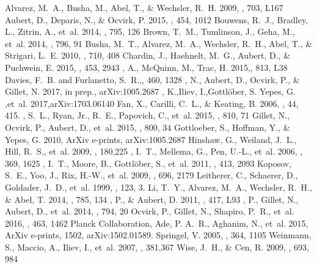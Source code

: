 \documentclass[twocolumn]{aastex61}
\begin{document}
\begin{thebibliography}{}

 Alvarez, M.~A., Busha, M., Abel, T., \& Wechsler, R.~H. 2009, \apjl,
  703, L167
 Aubert, D., Deparis, N., \& Ocvirk, P. 2015, \mnras, 454, 1012
 {Bouwens}, R.~J., {Bradley}, L., {Zitrin}, A., {et~al.} 2014, \apj, 795, 126
 {Brown}, T.~M., {Tumlinson}, J., {Geha}, M., {et~al.} 2014, \apj, 796, 91
 {Busha}, M.~T., {Alvarez}, M.~A., {Wechsler}, R.~H., {Abel}, T., \& {Strigari}, L.~E. 2010, \apj, 710, 408
 {Chardin}, J., {Haehnelt}, M.~G., {Aubert}, D., \& {Puchwein}, E. 2015, \mnras, 453, 2943
, A., {McQuinn}, M., {Trac}, H. 2015,\apjl, 813, L38
 {Davies}, F.~B. and {Furlanetto}, S.~R.,\mnras, 460, 1328
, N., {Aubert}, D., {Ocvirk}, P., \& {Gillet}, N. 2017, in prep.,
  arXiv:1005.2687
, K.,{Iliev}, I.,{Gottl{\"o}ber}, S.
	{Yepes}, G. ,{et~al.} 2017,arXiv:1703.06140
 Fan, X., Carilli, C.~L., \& Keating, B. 2006, \araa, 44, 415.
, S.~L., {Ryan}, Jr., R.~E., {Papovich}, C., {et~al.} 2015, \apj, 810, 71
 {Gillet}, N., {Ocvirk}, P., {Aubert}, D., {et~al.} 2015, \apj, 800, 34
 {Gottloeber}, S., {Hoffman}, Y., \& {Yepes}, G. 2010, ArXiv e-prints, arXiv:1005.2687
 {Hinshaw}, G., {Weiland}, J.~L., {Hill}, R.~S., {et~al.} 2009, \apjs, 180,225
, I.~T., {Mellema}, G., {Pen}, U.-L., {et~al.} 2006, \mnras, 369, 1625
, I.~T., {Moore}, B., {Gottl{\"o}ber}, S., {et~al.} 2011, \mnras, 413,
  2093
 {Koposov}, S.~E., {Yoo}, J., {Rix}, H.-W., {et~al.} 2009, \apj, 696, 2179
 Leitherer, C., Schaerer, D., Goldader, J.~D., {et~al.} 1999, \apjs, 123, 3.
 {Li}, T.~Y., {Alvarez}, M.~A., {Wechsler}, R.~H., \& {Abel}, T. 2014, \apj, 785, 134
, P., \& {Aubert}, D. 2011, \mnras, 417, L93
, P., {Gillet}, N., {Aubert}, D., {et~al.} 2014, \apj, 794, 20
 {Ocvirk}, P., {Gillet}, N., {Shapiro}, P.~R., {et~al.} 2016, \mnras, 463, 1462
 {Planck Collaboration}, Ade, P. A.~R., Aghanim, N., {et~al.} 2015, ArXiv e-prints, 1502, arXiv:1502.01589.
 {Springel}, V. 2005, \mnras, 364, 1105
 {Weinmann}, S., {Maccio}, A., {Iliev}, I., {et~al.} 2007, \mnras, 381,367
 {Wise}, J.~H., \& {Cen}, R. 2009, \apj, 693, 984


\end{thebibliography}
\end{document}
